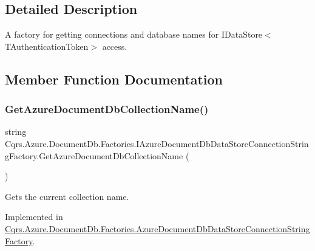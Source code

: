 \subsection{Detailed Description}
A factory for getting connections and database names for I\+Data\+Store$<$\+T\+Authentication\+Token$>$ access. 



\subsection{Member Function Documentation}
\mbox{\label{interfaceCqrs_1_1Azure_1_1DocumentDb_1_1Factories_1_1IAzureDocumentDbDataStoreConnectionStringFactory_a0ad3d0046331ea62ea2415f2c0af5675_a0ad3d0046331ea62ea2415f2c0af5675}} 
\subsubsection{\texorpdfstring{Get\+Azure\+Document\+Db\+Collection\+Name()}{GetAzureDocumentDbCollectionName()}}
{\footnotesize\ttfamily string Cqrs.\+Azure.\+Document\+Db.\+Factories.\+I\+Azure\+Document\+Db\+Data\+Store\+Connection\+String\+Factory.\+Get\+Azure\+Document\+Db\+Collection\+Name (\begin{DoxyParamCaption}{ }\end{DoxyParamCaption})}



Gets the current collection name. 



Implemented in \hyperlink{classCqrs_1_1Azure_1_1DocumentDb_1_1Factories_1_1AzureDocumentDbDataStoreConnectionStringFactory_a0685593d04e9a905d270800c278ddb42_a0685593d04e9a905d270800c278ddb42}{Cqrs.\+Azure.\+Document\+Db.\+Factories.\+Azure\+Document\+Db\+Data\+Store\+Connection\+String\+Factory}.

